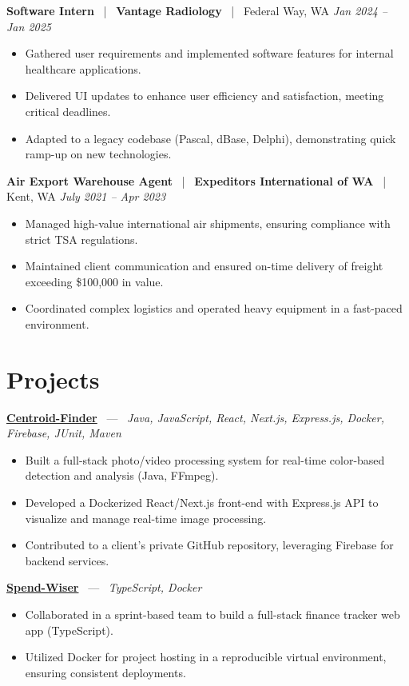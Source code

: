 \documentclass[10pt, letterpaper]{article}
\newcommand{\jobhead}[4]{%
  \vspace{5pt}%
  {\bfseries\color{dark}#1}%
  ~{\color{light}|}~%
  {\bfseries\color{navy}#2}%
  ~{\color{light}|}~%
  {\color{light}#3}%
  \hfill{\color{light}\small\textit{#4}}\\[-2pt]%
}
\newcommand{\projhead}[3]{%
  \vspace{5pt}%
  {\bfseries\color{dark}\href{#2}{#1}}%
  ~{\color{light}---}~%
  {\color{light}\small\textit{#3}}\\[-2pt]%
}
\begin{document}
\jobhead{Software Intern}{Vantage Radiology}{Federal Way, WA}{Jan 2024 – Jan 2025}
\begin{itemize}
  \item Gathered user requirements and implemented software features for internal healthcare applications.
  \item Delivered UI updates to enhance user efficiency and satisfaction, meeting critical deadlines.
  \item Adapted to a legacy codebase (Pascal, dBase, Delphi), demonstrating quick ramp-up on new technologies.
\end{itemize}

\jobhead{Air Export Warehouse Agent}{Expeditors International of WA}{Kent, WA}{July 2021 – Apr 2023}
\begin{itemize}
  \item Managed high-value international air shipments, ensuring compliance with strict TSA regulations.
  \item Maintained client communication and ensured on-time delivery of freight exceeding \$100,000 in value.
  \item Coordinated complex logistics and operated heavy equipment in a fast-paced environment.
\end{itemize}

\section{Projects}

\projhead{Centroid-Finder}{https://github.com/xavierb117/centroid-finder}{Java, JavaScript, React, Next.js, Express.js, Docker, Firebase, JUnit, Maven}
\begin{itemize}
  \item Built a full-stack photo/video processing system for real-time color-based detection and analysis (Java, FFmpeg).
  \item Developed a Dockerized React/Next.js front-end with Express.js API to visualize and manage real-time image processing.
  \item Contributed to a client's private GitHub repository, leveraging Firebase for backend services.
\end{itemize}

\projhead{Spend-Wiser}{https://github.com/JesseChum/w26-sdev372-spendwiser-finance-tracker}{TypeScript, Docker}
\begin{itemize}
  \item Collaborated in a sprint-based team to build a full-stack finance tracker web app (TypeScript).
  \item Utilized Docker for project hosting in a reproducible virtual environment, ensuring consistent deployments.
\end{itemize}
\end{document}
